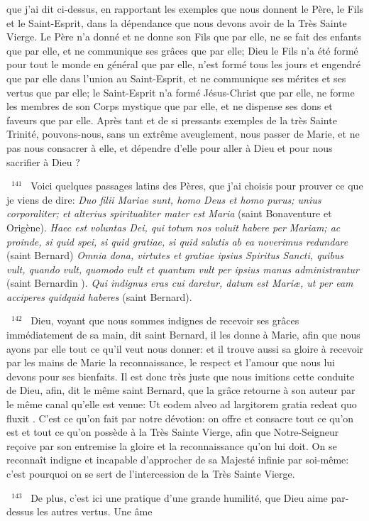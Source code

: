 \documentclass[paper=a5,pagesize=pdftex,fontsize=15pt,headinclude=on,twoside=off]{scrbook}
\newcommand{\negphantom}[1]{\settowidth{\dimen0}{#1}\hspace*{-\dimen0}}
\newcommand{\versenb}[1]{\par \vspace{10pt}~\negphantom{~${}^{#1}$~}${}^{#1}$~}
\newcommand{\latin}[1]{\emph{#1}}
\begin{document}
que j'ai dit ci-dessus, en rapportant les exemples que nous donnent le Père, le Fils et le Saint-Esprit, dans la
dépendance que nous devons avoir de la Très Sainte Vierge. Le Père n'a donné et ne donne son Fils que par elle,
ne se fait des enfants que par elle, et ne communique ses grâces que par elle; Dieu le Fils n'a été formé pour tout
le monde en général que par elle, n'est formé tous les jours et engendré que par elle dans l'union au Saint-Esprit,
et ne communique ses mérites et ses vertus que par elle; le Saint-Esprit n'a formé Jésus-Christ que par elle, ne
forme les membres de son Corps mystique que par elle, et ne dispense ses dons et faveurs que par elle. Après
tant et de si pressants exemples de la très Sainte Trinité, pouvons-nous, sans un extrême aveuglement, nous
passer de Marie, et ne pas nous consacrer à elle, et dépendre d'elle pour aller à Dieu et pour nous sacrifier à
Dieu ?
\versenb{141} Voici quelques passages latins des Pères, que j'ai choisis pour prouver ce que je viens de dire: \latin{Duo filii
Mariae sunt, homo Deus et homo purus; unius corporaliter; et alterius spiritualiter mater est Maria} (saint
Bonaventure et Origène).
\latin{Haec est voluntas Dei, qui totum nos voluit habere per Mariam; ac proinde, si quid spei, si quid gratiae, si quid
salutis ab ea noverimus redundare} (saint Bernard)
\latin{Omnia dona, virtutes et gratiae ipsius Spiritus Sancti, quibus vult, quando vult, quomodo vult et quantum vult per
ipsius manus administrantur} (saint Bernardin ).
\latin{Qui indignus eras cui daretur, datum est Mariæ, ut per eam acciperes quidquid haberes} (saint Bernard).
\versenb{142} Dieu, voyant que nous sommes indignes de recevoir ses grâces immédiatement de sa main, dit saint
Bernard, il les donne à Marie, afin que nous ayons par elle tout ce qu'il veut nous donner: et il trouve aussi sa
gloire à recevoir par les mains de Marie la reconnaissance, le respect et l'amour que nous lui devons pour ses
bienfaits. Il est donc très juste que nous imitions cette conduite de Dieu, afin, dit le même saint Bernard, que la
grâce retourne à son auteur par le même canal qu'elle est venue: Ut eodem alveo ad largitorem gratia redeat quo
fluxit .
C'est ce qu'on fait par notre dévotion: on offre et consacre tout ce qu'on est et tout ce qu'on possède à la Très
Sainte Vierge, afin que Notre-Seigneur reçoive par son entremise la gloire et la reconnaissance qu'on lui doit. On
se reconnaît indigne et incapable d'approcher de sa Majesté infinie par soi-même: c'est pourquoi on se sert de
l'intercession de la Très Sainte Vierge.
\versenb{143} De plus, c'est ici une pratique d'une grande humilité, que Dieu aime par-dessus les autres vertus. Une âme
\end{document}
